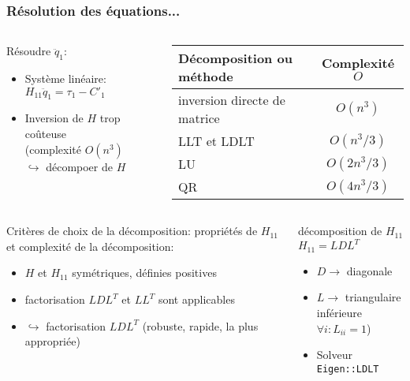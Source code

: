 \documentclass[10pt]{beamer}
\begin{document}
\begin{frame}[allowframebreaks]
  \frametitle{Résolution des équations...}
  
  \begin{columns}[T]
	\begin{column}{0.5\textwidth}
		Résoudre $\ddot{q}_1$:
		\begin{itemize}
		\item Système linéaire: $H_{11} \ddot{q}_1 = \tau_1 - C'_1$
		\item Inversion de $H$ trop coûteuse \\
		      (complexité $O(n^3)$ \\
		      $\hookrightarrow$  décompoer de $H$
		\end{itemize}
  \end{column}
	\begin{column}{0.5\textwidth}\scriptsize
		\begin{tabular}[H]{|l|c|}
		\hline
		Décomposition ou méthode & Complexité $O$ \\ \hline \hline
		inversion directe de matrice & $O(n^3)$ \\ \hline
		LLT et LDLT & $O(n^3/3)$ \\ \hline
		LU & $O(2n^3/3)$ \\ \hline
		QR & $O(4n^3/3)$ \\
		\hline
		\end{tabular}
	\end{column}
	\end{columns}

  \bigskip
  
  \begin{columns}[T]
	\begin{column}{0.55\textwidth}
		Critères de choix de la décomposition: propriétés de $H_{11}$ et complexité de la décomposition:
		\begin{itemize}
		\item $H$ et $H_{11}$ symétriques, définies positives 
		\item factorisation $LDL^T$ et $LL^T$ sont applicables
		\item $\hookrightarrow$ factorisation $LDL^T$ (robuste, rapide, la plus appropriée)
		\end{itemize}
  \end{column}
	\begin{column}{0.45\textwidth}
	  \begin{alertblock}{décomposition de $H_{11}$}
    $H_{11} = L D L^T$
    \begin{itemize}
	    \item $D \longrightarrow$ diagonale
	    \item $L \longrightarrow$ triangulaire inférieure \\
	                              $\forall i: L_{ii}=1$)
	    \item Solveur \verb;Eigen::LDLT;
	  \end{itemize}
    \end{alertblock}
	\end{column}
	\end{columns} \vfill


\end{frame}
\end{document}
